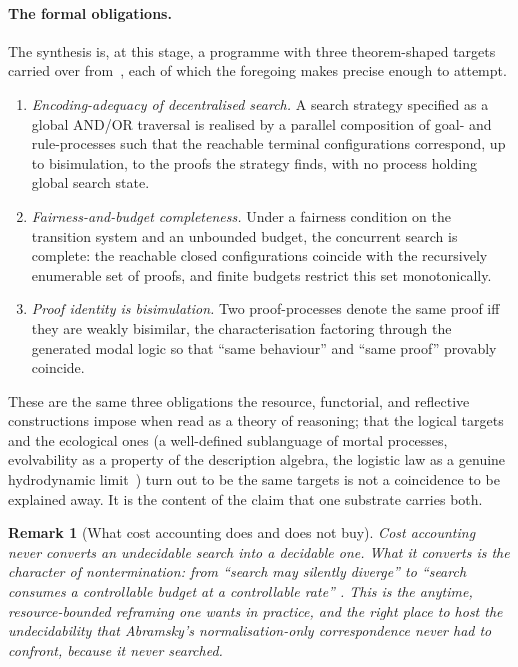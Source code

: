 \documentclass[11pt]{article}
\theoremstyle{definition}
\theoremstyle{plain}
\newtheorem{remark}[definition]{Remark}
\begin{document}
\paragraph{The formal obligations.} The synthesis is, at this stage, a programme
with three theorem-shaped targets carried over from~\cite{NoteIV}, each of which
the foregoing makes precise enough to attempt.
\begin{enumerate}[label=(\arabic*),leftmargin=2.2em]
\item \emph{Encoding-adequacy of decentralised search.} A search strategy
specified as a global AND/OR traversal is realised by a parallel composition of
goal- and rule-processes such that the reachable terminal configurations
correspond, up to bisimulation, to the proofs the strategy finds, with no process
holding global search state.
\item \emph{Fairness-and-budget completeness.} Under a fairness condition on the
transition system and an unbounded budget, the concurrent search is complete:
the reachable closed configurations coincide with the recursively enumerable set
of proofs, and finite budgets restrict this set monotonically.
\item \emph{Proof identity is bisimulation.} Two proof-processes denote the same
proof iff they are weakly bisimilar, the characterisation factoring through the
generated modal logic so that ``same behaviour'' and ``same proof'' provably
coincide.
\end{enumerate}
These are the same three obligations the resource, functorial, and reflective
constructions impose when read as a theory of reasoning; that the logical targets
and the ecological ones (a well-defined sublanguage of mortal processes,
evolvability as a property of the description algebra, the logistic law as a
genuine hydrodynamic limit~\cite{NoteIII}) turn out to be the same targets is not
a coincidence to be explained away. It is the content of the claim that one
substrate carries both.

\begin{remark}[What cost accounting does and does not buy]
Cost accounting never converts an undecidable search into a decidable one. What
it converts is the character of nontermination: from ``search may silently
diverge'' to ``search consumes a controllable budget at a controllable rate''
\cite{NoteIV}. This is the anytime, resource-bounded reframing one wants in
practice, and the right place to host the undecidability that Abramsky's
normalisation-only correspondence never had to confront, because it never
searched.
\end{remark}
\end{document}
